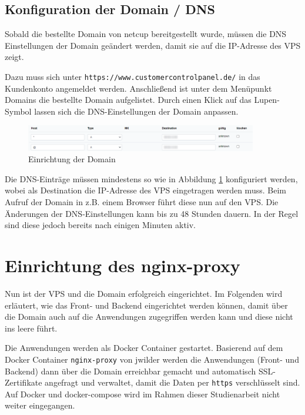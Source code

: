 \subsection{Konfiguration der Domain / DNS}
Sobald die bestellte Domain von netcup bereitgestellt wurde, müssen die DNS Einstellungen der Domain geändert werden, damit sie auf die IP-Adresse des \ac{VPS} zeigt.

Dazu muss sich unter \lstinline{https://www.customercontrolpanel.de/} in das Kundenkonto angemeldet werden. Anschließend ist unter dem Menüpunkt \glqq Domains\grqq{} die bestellte Domain aufgelistet. Durch einen Klick auf das Lupen-Symbol lassen sich die DNS-Einstellungen der Domain anpassen.

\begin{figure}[H]
  \includegraphics[width=0.9\textwidth]{images/netcup-dns.png}
  \centering
  \caption[Einrichtung der Domain]{Einrichtung der Domain}
  \label{fig:netcup-dns}
\end{figure}

Die DNS-Einträge müssen mindestens so wie in Abbildung \ref{fig:netcup-dns} konfiguriert werden, wobei als Destination die IP-Adresse des \ac{VPS} eingetragen werden muss. Beim Aufruf der Domain in z.B. einem Browser führt diese nun auf den \ac{VPS}. Die Änderungen der DNS-Einstellungen kann bis zu 48 Stunden dauern. In der Regel sind diese jedoch bereits nach einigen Minuten aktiv.

\section{Einrichtung des nginx-proxy}
Nun ist der \ac{VPS} und die Domain erfolgreich eingerichtet. Im Folgenden wird erläutert, wie das Front- und Backend eingerichtet werden können, damit über die Domain auch auf die Anwendungen zugegriffen werden kann und diese nicht ins leere führt.

Die Anwendungen werden als Docker Container gestartet. Basierend auf dem Docker Container \lstinline{nginx-proxy} von jwilder werden die Anwendungen (Front- und Backend) dann über die Domain erreichbar gemacht und automatisch SSL-Zertifikate angefragt und verwaltet, damit die Daten per \lstinline{https} verschlüsselt sind. Auf Docker und docker-compose wird im Rahmen dieser Studienarbeit nicht weiter eingegangen.

